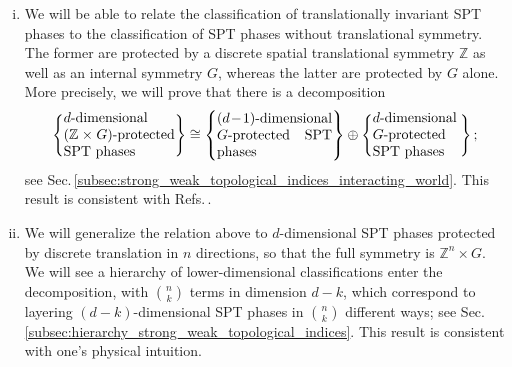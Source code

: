 \documentclass[sort&compress]{elsarticle}
\theoremstyle{theoremstyle}
\theoremstyle{framedtheoremstyle}
\theoremstyle{definitionstyle}
\theoremstyle{definitionstyle}
\theoremstyle{definitionstyle}
\theoremstyle{definitionstyle}
\theoremstyle{nameddefinitionstyle}
\theoremstyle{framednameddefinitionstyle}
\theoremstyle{proofstyle}
\theoremstyle{definitionstyle}
\newcommand{\ZZZ}{\mathbb{Z}}
\newcommand{\isomorphic}{\cong}
\newcommand{\braces}[1]{\left\{ #1 \right\}}
\begin{document}
\begin{enumerate}[(i)]
\item We will be able to relate the classification of translationally invariant SPT phases to the classification of SPT phases without translational symmetry.
The former are protected by a discrete spatial translational symmetry $\ZZZ$ as well as an internal symmetry $G$, whereas the latter are protected by $G$ alone.
More precisely, we will prove that there is a decomposition
\begin{eqnarray}
\braces{\parbox{2.8cm}{$d$-dimensional $(\ZZZ \times G)$-protected SPT phases}}
\isomorphic
\braces{\parbox{2.9cm}{$(d-1)$-dimensional $G$-protected SPT phases}}
\oplus
\braces{\parbox{2.2cm}{$d$-dimensional $G$-protected SPT phases}};
\end{eqnarray}
see Sec.\,\ref{subsec:strong_weak_topological_indices_interacting_world}.
This result is consistent with Refs.\,\cite{Wen_1d, Cirac, Wen_sgSPT_1d}.


\item We will generalize the relation above to $d$-dimensional SPT phases protected by discrete translation in $n$ directions, so that the full symmetry is $\ZZZ^n \times G$. We will see a hierarchy of lower-dimensional classifications enter the decomposition, with $n \choose k$ terms in dimension $d-k$, which correspond to layering $(d-k)$-dimensional SPT phases in $n \choose k$ different ways; see Sec.\,\ref{subsec:hierarchy_strong_weak_topological_indices}. This result is consistent with one's physical intuition.


\end{enumerate}
\end{document}
